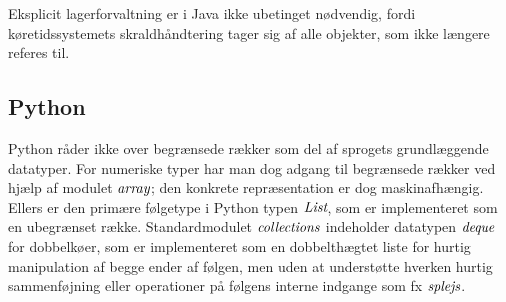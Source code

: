 Eksplicit lagerforvaltning er i Java ikke ubetinget nødvendig, fordi køretidssystemets skraldhåndtering tager sig af alle objekter, som ikke længere referes til.

\subsection{Python}

Python råder ikke over begrænsede rækker som del af sprogets grundlæggende datatyper. 
For numeriske typer har man dog adgang til begrænsede rækker ved hjælp af modulet $\operatorname{\emph{array}}$; den konkrete repræsentation er dog maskinafhængig.
Ellers er den primære følgetype i Python typen $\operatorname{\emph{List}}$, som er implementeret som en ubegrænset række.
Standardmodulet $\operatorname{\emph{collections}}$ indeholder datatypen $\operatorname{\emph{deque}}$ for dobbelkøer, som er implementeret som en dobbelthægtet liste for hurtig manipulation af begge ender af følgen, men uden at understøtte hverken hurtig sammenføjning eller operationer på følgens interne indgange som fx $\operatorname{\emph{splejs}}$.












